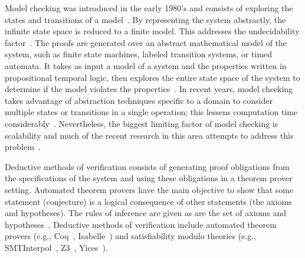 Model checking was introduced in the early 1980's and consists of exploring the states and transitions of a model~\cite{clarke1981design,queille1982specification}. By representing the system abstractly, the infinite state space is reduced to a finite model. This addresses the undecidability factor~\cite{d2008survey}. The proofs are generated over an abstract mathematical model of the system, such as finite state machines, labeled transition systems, or timed automata. It takes as input a model of a system and the properties written in propositional temporal logic, then explores the entire state space of the system to determine if the model violates the properties~\cite{clarke2018model,fraser2009testing}. In recent years, model checking takes advantage of abstraction techniques specific to a domain to consider multiple states or transitions in a single operation; this lessens computation time considerably~\cite{d2008survey}. Nevertheless, the biggest limiting factor of model checking is scalability and much of the recent research in this area attempts to address this problem~\cite{clarke2018model}.

Deductive methods of verification consists of generating proof obligations from the specifications of the system and using these obligations in a theorem prover setting. Automated theorem provers have the main objective to show that some statement (conjecture) is a logical consequence of other statements (the axioms and hypotheses). The rules of inference are given as are the set of axioms and hypotheses~\cite{d2008survey,fitting2012first}. Deductive methods of verification include automated theorem provers (e.g., Coq~\cite{coq}, Isabelle~\cite{isabelle}) and satisfiability modulo theories (e.g., SMTInterpol~\cite{smtInterpol}, Z3~\cite{z3}, Yices~\cite{yices}). 


